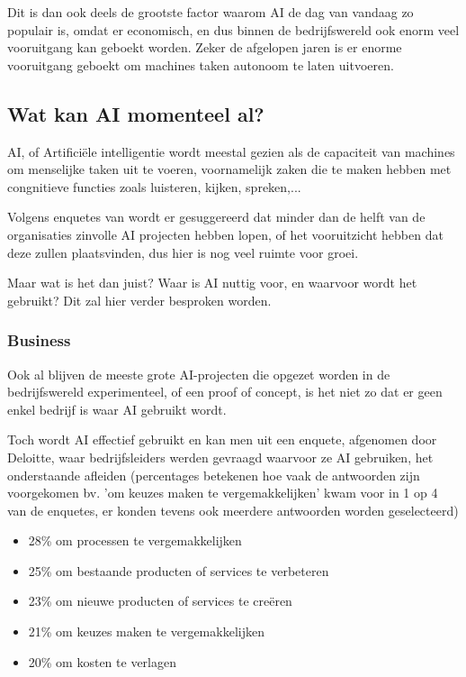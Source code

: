 Dit is dan ook deels de grootste factor waarom AI de dag van vandaag zo populair is, omdat er economisch, en dus binnen de bedrijfswereld ook enorm veel vooruitgang kan geboekt worden. Zeker de afgelopen jaren is er enorme vooruitgang geboekt om machines taken autonoom te laten uitvoeren.

\subsection{Wat kan AI momenteel al?}

AI, of Artificiële intelligentie wordt meestal gezien als de capaciteit van machines om menselijke taken uit te voeren, voornamelijk zaken die te maken hebben met congnitieve functies zoals luisteren, kijken, spreken,... 

Volgens enquetes van \cite{benbya2020artificial} wordt er gesuggereerd dat minder dan de helft van de organisaties zinvolle AI projecten hebben lopen, of het vooruitzicht hebben dat deze zullen plaatsvinden, dus hier is nog veel ruimte voor groei. 

Maar wat is het dan juist? Waar is AI nuttig voor, en waarvoor wordt het gebruikt? Dit zal hier verder besproken worden.

\subsubsection{Business}
Ook al blijven de meeste grote AI-projecten die opgezet worden in de bedrijfswereld experimenteel, of een proof of concept, is het niet zo dat er geen enkel bedrijf is waar AI gebruikt wordt. 

Toch wordt AI effectief gebruikt en kan men uit een enquete, afgenomen door Deloitte, waar bedrijfsleiders werden gevraagd waarvoor ze AI gebruiken, het onderstaande afleiden (percentages betekenen hoe vaak de antwoorden zijn voorgekomen bv. 'om keuzes maken te vergemakkelijken' kwam voor in 1 op 4 van de enquetes, er konden tevens ook meerdere antwoorden worden geselecteerd)

\begin{itemize}
    \item 28\% om processen te vergemakkelijken
    \item 25\% om bestaande producten of services te verbeteren
    \item 23\% om nieuwe producten of services te creëren
    \item 21\% om keuzes maken te vergemakkelijken
    \item 20\% om kosten te verlagen
\end{itemize}

